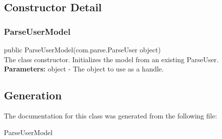\subsection{Constructor Detail}

\subsubsection{ParseUserModel}

public ParseUserModel(com.parse.ParseUser object)\\

The class constructor. Initializes the model from an existing ParseUser.\\

\textbf{Parameters:}
\tab    object - The object to use as a handle.\\


\subsection{Generation}
The documentation for this class was generated from the following file\-:
\begin{DoxyCompactItemize}
\item ParseUserModel
\end{DoxyCompactItemize} 










